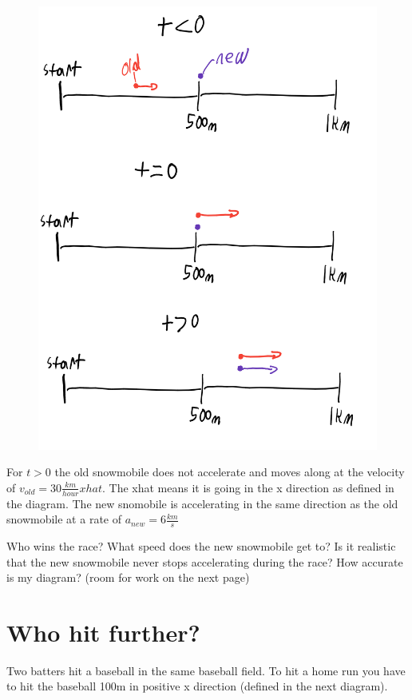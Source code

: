 \documentclass[12pt]{article}
\begin{document}
\begin{figure}[h]
\includegraphics[scale=0.15]{snowmobileRally.png}
\end{figure}

For $t > 0$ the old snowmobile does not accelerate and moves along at the velocity of $v_{old} = 30 \frac{km}{hour} xhat$. The xhat means it is going in the x direction as defined in the diagram. The new snomobile is accelerating in the same direction as the old snowmobile at a rate of $a_{new} = 6\frac{km}{s}$

Who wins the race? What speed does the new snowmobile get to? Is it realistic that the new snowmobile never stops accelerating during the race? How accurate is my diagram? (room for work on the next page)

\parbox[][12cm][t]{8cm}{}

\section{Who hit further?}
Two batters hit a baseball in the same baseball field. To hit a home run you have to hit the baseball 100m in positive x direction (defined in the next diagram).
\end{document}
